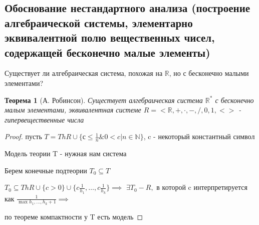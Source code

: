 \documentclass[a4paper]{article}
\newtheorem{theorem}{Теорема}[section]
\theoremstyle{definition}
\theoremstyle{remark}
\begin{document}
    \subsection{Обоснование нестандартного анализа (построение алгебраической системы, элементарно эквивалентной полю вещественных чисел, содержащей бесконечно малые элементы)}
    Существует ли алгебраическая система, похожая на $\mathbb{R}$, но с бесконечно малыми элементами? 
    \begin{theorem}[А. Робинсон]
        Существует алгебраическая система $\mathbb{R}^*$ с бесконечно малым элементами, эквивалентная системе
        $R = <\mathbb{R}, +, \cdot, -, /, 0, 1, <>$ - гипервещественные числа
    \end{theorem}
    \begin{proof}
        пусть $T = Th R \cup \{с\leq \frac{1}{n} \& 0 < c | n\in \mathbb{N}\}$, c - некоторый константный символ

        Модель теории T - нужная нам система

        Берем конечные подтеории $T_0\subseteq T$

        $T_0\subseteq Th R \cup \{c > 0\} \cup \{c \frac{1}{h_1}, \dots, c \frac{1}{h_k}\}\implies$
        $\exists T_0 - R,$ в которой c интерпретируется как $\frac{1}{\max{h_1, \dots, h_k}+1}\implies$
        
        по теореме компактности у T есть модель
    \end{proof}
\end{document}
